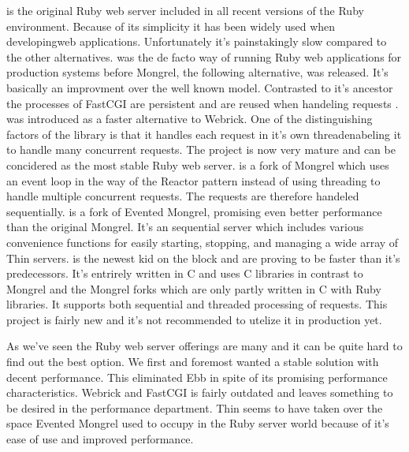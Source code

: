 \begin{items}
   is the original Ruby web server included in all recent
    versions of the Ruby environment. Because of its simplicity it has
    been widely used when developingweb applications. Unfortunately it's
    painstakingly slow compared to the other alternatives.
   was the de facto way of running Ruby web applications
    for production systems before Mongrel, the following alternative,
    was released. It's basically an improvment over the well known
     model. Contrasted to it's ancestor the processes
    of FastCGI are persistent and are reused when handeling requests
    \citep{openmarket96}.
   was introduced as a faster alternative to Webrick.
    One of the distinguishing factors of the library is that it
    handles each request in it's own thread\dash{}enabeling it to
    handle many concurrent requests. The project is now very mature
    and can be concidered as the most stable Ruby web server.
   is a fork of Mongrel which uses
    an event loop in the way of the Reactor pattern
    \citep[]{schmidt95}
    instead of using threading to handle multiple concurrent requests.
    The requests are therefore handeled sequentially.
   is a fork of Evented Mongrel, promising even better
    performance than the original Mongrel. It's an sequential
    server which includes various
    convenience functions for easily starting, stopping, and managing
    a wide array of Thin servers.
   is the newest kid on the block and are proving to be
    faster than it's predecessors. It's entrirely written in C
    and uses C libraries in contrast to Mongrel and the Mongrel forks
    which are only partly written in C with Ruby libraries.
    It supports both sequential and threaded processing of requests.
    This project is fairly new and it's not recommended to utelize it
    in production yet.
\end{items}

As we've seen the Ruby web server offerings are many and it can be quite hard
to find out the best option. We first and foremost wanted a stable solution
with decent performance. This eliminated Ebb in spite of its promising
performance characteristics. Webrick and FastCGI is fairly outdated and leaves
something to be desired in the performance department. Thin seems to have
taken over the space Evented Mongrel used to occupy in the Ruby server world
because of it's ease of use and improved performance.

